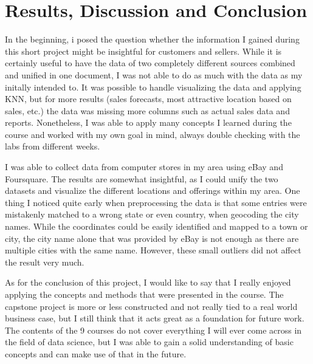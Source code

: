 \chapter{Results, Discussion and Conclusion}
\label{results}
\label{discussion}
In the beginning, i posed the question whether the information I gained during this short project might be insightful for customers and sellers. While it is certainly useful to have the data of two completely different sources combined and unified in one document, I was not able to do as much with the data as my initally intended to. It was possible to handle visualizing the data and applying KNN, but for more results (sales forecasts, most attractive location based on sales, etc.) the data was missing more columns such as actual sales data and reports. Nonetheless, I was able to apply many concepts I learned during the course and worked with my own goal in mind, always double checking with the labs from different weeks.

I was able to collect data from computer stores in my area using eBay and Foursquare. The results are somewhat insightful, as I could unify the two datasets and visualize the different locations and offerings within my area. One thing I noticed quite early when preprocessing the data is that some entries were mistakenly matched to a wrong state or even country, when geocoding the city names. While the coordinates could be easily identified and mapped to a town or city, the city name alone that was provided by eBay is not enough as there are multiple cities with the same name. However, these small outliers did not affect the result very much.

As for the conclusion of this project, I would like to say that I really enjoyed applying the concepts and methods that were presented in the course. The capstone project is more or less constructed and not really tied to a real world business case, but I still think that it acts great as a foundation for future work. The contents of the 9 courses do not cover everything I will ever come across in the field of data science, but I was able to gain a solid understanding of basic concepts and can make use of that in the future.